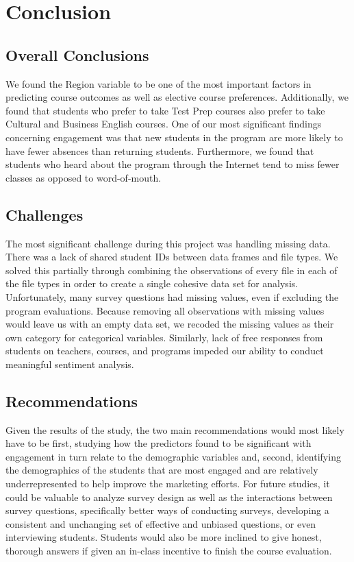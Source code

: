 \documentclass[12pt,letterpaper]{article}
\begin{document}
\newpage

\section{Conclusion}

\subsection{Overall Conclusions}

We found the Region variable to be one of the most important factors in predicting course outcomes as well as elective course preferences. Additionally, we found that students who prefer to take Test Prep courses also prefer to take Cultural and Business English courses. One of our most significant findings concerning engagement was that new students in the program are more likely to have fewer absences than returning students. Furthermore, we found that students who heard about the program through the Internet tend to miss fewer classes as opposed to word-of-mouth.

\subsection{Challenges}

The most significant challenge during this project was handling missing data. There was a lack of shared student IDs between data frames and file types. We solved this partially through combining the observations of every file in each of the file types in order to create a single cohesive data set for analysis. Unfortunately, many survey questions had missing values, even if excluding the program evaluations. Because removing all observations with missing values would leave us with an empty data set, we recoded the missing values as their own category for categorical variables. Similarly, lack of free responses from students on teachers, courses, and programs impeded our ability to conduct meaningful sentiment analysis.

\subsection{Recommendations}

Given the results of the study, the two main recommendations would most likely have to be first, studying how the predictors found to be significant with engagement in turn relate to the demographic variables and, second, identifying the demographics of the students that are most engaged and are relatively underrepresented to help improve the marketing efforts. For future studies, it could be valuable to analyze survey design as well as the interactions between survey questions, specifically better ways of conducting surveys, developing a consistent and unchanging set of effective and unbiased questions, or even interviewing students. Students would also be more inclined to give honest, thorough answers if given an in-class incentive to finish the course evaluation.
\end{document}
